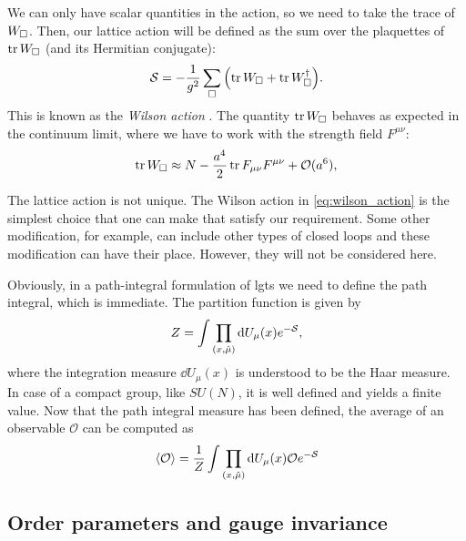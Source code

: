 We can only have scalar quantities in the action, so we need to take the trace of $W_{\square}$.
Then, our lattice action will be defined as the sum over the plaquettes of $\tr W_{\square}$ (and its Hermitian conjugate):
\begin{equation}
    \mathcal{S} = - \frac{1}{g^2} \sum_{\square} \qty( \tr W_{\square} + \tr W_{\square}^{\dagger} ).
    \label{eq:wilson_action}
\end{equation}
This is known as the \emph{Wilson action} \citneeded.
The quantity $\tr W_{\square}$ behaves as expected in the continuum limit, where we have to work with the strength field $F^{\mu \nu}$:
\begin{equation}
    \tr W_{\square} \approx N - \frac{a^{4}}{2} \tr F_{\mu \nu} F^{\mu \nu} + \mathcal{O}(a^6),
\end{equation}

The lattice action is not unique.
The Wilson action in \eqref{eq:wilson_action} is the simplest choice that one can make that satisfy our requirement.
Some other modification, for example, can include other types of closed loops and these modification can have their place.
However, they will not be considered here.

Obviously, in a path-integral formulation of \ac{lgt}s we need to define the path integral, which is immediate.
The partition function is given by
\begin{equation}
    Z = \int \prod_{(x, \hat{\mu})}  \dd U_{\mu}(x) e^{- \mathcal{S}},
\end{equation}
where the integration measure $\dd U_{\mu}(x)$ is understood to be the Haar measure.
In case of a compact group, like $SU(N)$, it is well defined and yields a finite value.
Now that the path integral measure has been defined, the average of an observable $\mathcal{O}$ can be computed as
\begin{equation}
    \ev*{\mathcal{O}} = \frac{1}{Z} \int \prod_{(x, \hat{\mu})} \dd U_{\mu}(x) \mathcal{O} e^{- \Action}
\end{equation}


%
%
\subsection{Order parameters and gauge invariance}
\label{sub:wilson_confinement_test}

